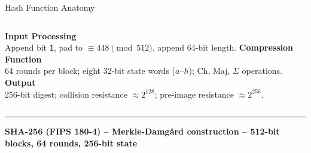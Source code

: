 \documentclass[8pt,aspectratio=169]{beamer}
\newcommand{\bottomnote}[1]{%
\vfill
\vspace{-2mm}
\textcolor{mllavender2}{\rule{\textwidth}{0.4pt}}
\vspace{1mm}
\footnotesize
\textbf{#1}
}
\begin{document}
\begin{frame}{Hash Function Anatomy}
\begin{center}
\end{center}
\vspace{-1mm}
\begin{columns}[T]
    \textbf{\textcolor{mlpurple}{Input Processing}}\\
    \scriptsize Append bit \texttt{1}, pad to $\equiv 448 \pmod{512}$, append 64-bit length.
    \textbf{\textcolor{mlpurple}{Compression Function}}\\
    \scriptsize 64 rounds per block; eight 32-bit state words ($a$--$h$); Ch, Maj, $\Sigma$ operations.
    \textbf{\textcolor{mlblue}{Output}}\\
    \scriptsize 256-bit digest; collision resistance $\approx 2^{128}$; pre-image resistance $\approx 2^{256}$.
\end{columns}
\bottomnote{SHA-256 (FIPS 180-4) -- Merkle-Damg\r{a}rd construction -- 512-bit blocks, 64 rounds, 256-bit state}
\end{frame}
\end{document}
